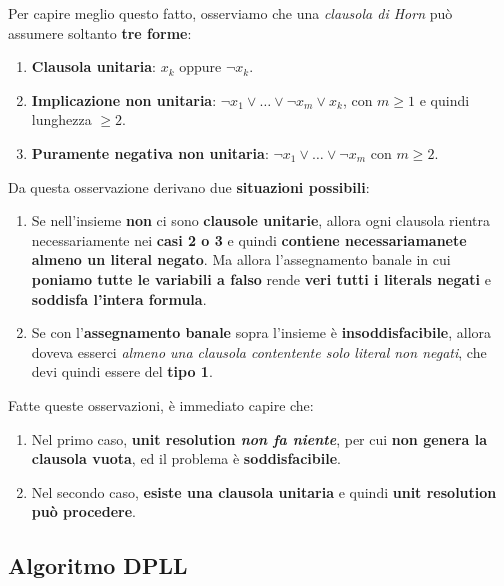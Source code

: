 Per capire meglio questo fatto, osserviamo che una \textit{clausola di Horn} può assumere
soltanto \textbf{tre forme}:
\begin{enumerate}
    \item \textbf{Clausola unitaria}: $x_k$ oppure $\neg x_k$.
    \item \textbf{Implicazione non unitaria}: $\neg x_{1} \lor \ldots \lor \neg x_m \lor x_k$,
        con $m\ge 1$ e quindi lunghezza $\ge 2$.
    \item \textbf{Puramente negativa non unitaria}: $\neg x_{1} \lor \ldots \lor \neg x_m$
        con $m\ge 2$.
\end{enumerate}

Da questa osservazione derivano due \textbf{situazioni possibili}:
\begin{enumerate}
    \item Se nell'insieme \textbf{non} ci sono \textbf{clausole unitarie}, allora ogni
        clausola rientra necessariamente nei \textbf{casi 2 o 3} e quindi
        \textbf{contiene necessariamanete almeno un literal negato}.
        Ma allora l'assegnamento banale in cui \textbf{poniamo tutte le variabili a falso}
        rende \textbf{veri tutti i literals negati} e \textbf{soddisfa l'intera formula}.
    \item Se con l'\textbf{assegnamento banale} sopra l'insieme è \textbf{insoddisfacibile},
        allora doveva esserci \textit{almeno una clausola contentente solo literal non negati},
        che devi quindi essere del \textbf{tipo 1}.
\end{enumerate}

\begin{remark}
    Fatte queste osservazioni, è immediato capire che:
    \begin{enumerate}
        \item Nel primo caso, \textbf{unit resolution \textit{non fa niente}}, per cui
            \textbf{non genera la clausola vuota}, ed il problema è \textbf{soddisfacibile}.
        \item Nel secondo caso, \textbf{esiste una clausola unitaria} e quindi
            \textbf{unit resolution può procedere}.
    \end{enumerate}
\end{remark}

\subsection{Algoritmo DPLL}

